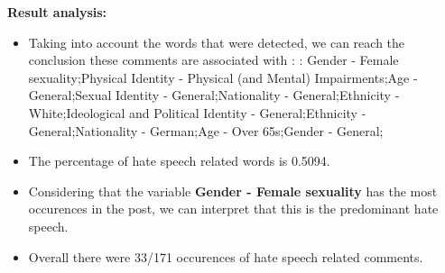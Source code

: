 \documentclass[11pt]{article}
\begin{document}
\textbf{\Large Result analysis:}

\begin{itemize}\item Taking into account the words that were detected, we can reach the conclusion these comments are associated with : : Gender - Female sexuality;Physical Identity - Physical (and Mental) Impairments;Age - General;Sexual Identity - General;Nationality - General;Ethnicity - White;Ideological and Political Identity - General;Ethnicity - General;Nationality - German;Age - Over 65s;Gender - General;%

\item The percentage of hate speech related words is 0.5094.

\item Considering that the variable \textbf{Gender - Female sexuality} has the most occurences in the post, we can interpret that this is the predominant hate speech.

\item Overall there were 33/171 occurences of hate speech related comments.\end{itemize}
\end{document}
